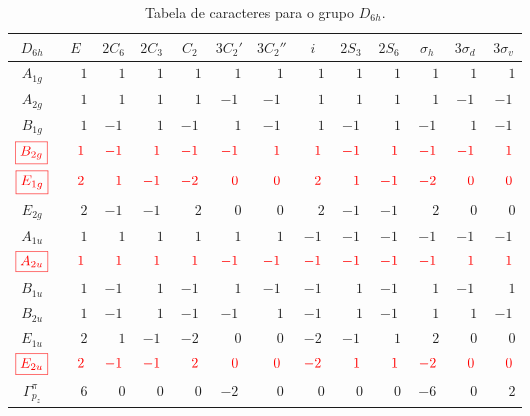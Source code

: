\documentclass[a4paper,10pt]{article}
\renewcommand{\p}{\phantom{+}}
\renewcommand{\c}[1]{\textcolor{red}{#1}}
\begin{document}
\begin{table}[H]
\caption{Tabela de caracteres para o grupo $D_{6h}$.}
\centering

\begin{tabular} { |c|c c c c c c c c c c c c | }
\hline
$D_{6h}$ & $E$ & $2 C_6$ & $2 C_3$ & $C_2$ & $3 C_2'$ & $3 C_2''$ & $i$ & $2 S_3$ & $2 S_6$ & $\sigma_h$ & $3 \sigma_d$ & $3 \sigma_v$ \\
\hline
$A_{1g}$ & $\p1$ & $\p1$ & $\p1$ & $\p1$ & $\p1$ & $\p1$ & $\p1$ & $\p1$ & $\p1$ & $\p1$ & $\p1$ & $\p1$ \\
$A_{2g}$ & $\p1$ & $\p1$ & $\p1$ & $\p1$ & $ -1$ & $ -1$ & $\p1$ & $\p1$ & $\p1$ & $\p1$ & $ -1$ & $ -1$ \\
$B_{1g}$ & $\p1$ & $ -1$ & $\p1$ & $ -1$ & $\p1$ & $ -1$ & $\p1$ & $ -1$ & $\p1$ & $ -1$ & $\p1$ & $ -1$ \\
$\c{\boxed{B_{2g}}}$ & $\c{\p1}$ & $\c{ -1}$ & $\c{\p1}$ & $\c{ -1}$ & $\c{ -1}$ & $\c{\p1}$ & $\c{\p1}$ & $\c{ -1}$ & $\c{\p1}$ & $\c{ -1}$ & $\c{ -1}$ & $\c{\p1}$ \\
$\c{\boxed{E_{1g}}}$ & $\c{\p2}$ & $\c{\p1}$ & $\c{ -1}$ & $\c{ -2}$ & $\c{\p0}$ & $\c{\p0}$ & $\c{\p2}$ & $\c{\p1}$ & $\c{ -1}$ & $\c{ -2}$ & $\c{\p0}$ & $\c{\p0}$ \\
$E_{2g}$ & $\p2$ & $ -1$ & $ -1$ & $\p2$ & $\p0$ & $\p0$ & $\p2$ & $ -1$ & $ -1$ & $\p2$ & $\p0$ & $\p0$ \\
$A_{1u}$ & $\p1$ & $\p1$ & $\p1$ & $\p1$ & $\p1$ & $\p1$ & $ -1$ & $ -1$ & $ -1$ & $ -1$ & $ -1$ & $ -1$ \\
$\c{\boxed{A_{2u}}}$ & $\c{\p1}$ & $\c{\p1}$ & $\c{\p1}$ & $\c{\p1}$ & $\c{ -1}$ & $\c{ -1}$ & $\c{ -1}$ & $\c{ -1}$ & $\c{ -1}$ & $\c{ -1}$ & $\c{\p1}$ & $\c{\p1}$ \\
$B_{1u}$ & $\p1$ & $ -1$ & $\p1$ & $ -1$ & $\p1$ & $ -1$ & $ -1$ & $\p1$ & $ -1$ & $\p1$ & $ -1$ & $\p1$ \\
$B_{2u}$ & $\p1$ & $ -1$ & $\p1$ & $ -1$ & $ -1$ & $\p1$ & $ -1$ & $\p1$ & $ -1$ & $\p1$ & $\p1$ & $ -1$ \\
$E_{1u}$ & $\p2$ & $\p1$ & $ -1$ & $ -2$ & $\p0$ & $\p0$ & $ -2$ & $ -1$ & $\p1$ & $\p2$ & $\p0$ & $\p0$ \\
$\c{\boxed{E_{2u}}}$ & $\c{\p2}$ & $\c{ -1}$ & $\c{ -1}$ & $\c{\p2}$ & $\c{\p0}$ & $\c{\p0}$ & $\c{ -2}$ & $\c{\p1}$ & $\c{\p1}$ & $\c{ -2}$ & $\c{\p0}$ & $\c{\p0}$ \\
\hline
\hline
$\Gamma_{p_z}^\pi$ & $\p6$ & $\p0$ & $\p0$ & $\p0$ & $ -2$ & $\p0$ & $\p0$ & $\p0$ & $\p0$ & $ -6$ & $\p0$ & $\p2$ \\
\hline
\end{tabular}

\label{tab:mult_D6h}
\end{table}
\end{document}
